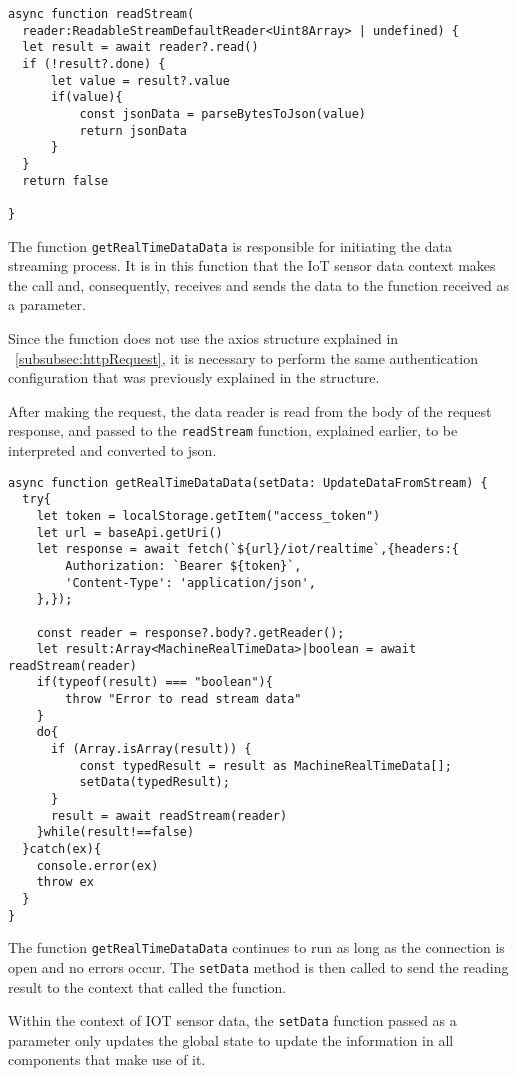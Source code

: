 \begin{verbatim}
async function readStream(
  reader:ReadableStreamDefaultReader<Uint8Array> | undefined) {
  let result = await reader?.read()
  if (!result?.done) {
      let value = result?.value
      if(value){
          const jsonData = parseBytesToJson(value)        
          return jsonData
      }
  }
  return false

}
\end{verbatim}

The function \texttt{getRealTimeDataData} is responsible for initiating the data streaming process. It is in this function that the IoT sensor data context makes the call and, consequently, receives and sends the data to the function received as a parameter.

Since the function does not use the axios structure explained in ~\ref{subsubsec:httpRequest}, it is necessary to perform the same authentication configuration that was previously explained in the structure.

After making the request, the data reader is read from the body of the request response, and passed to the \texttt{readStream} function, explained earlier, to be interpreted and converted to \gls{json}.

\begin{verbatim}
async function getRealTimeDataData(setData: UpdateDataFromStream) {
  try{
    let token = localStorage.getItem("access_token")
    let url = baseApi.getUri()
    let response = await fetch(`${url}/iot/realtime`,{headers:{
        Authorization: `Bearer ${token}`,
        'Content-Type': 'application/json',
    },});

    const reader = response?.body?.getReader();
    let result:Array<MachineRealTimeData>|boolean = await readStream(reader)
    if(typeof(result) === "boolean"){
        throw "Error to read stream data"
    }
    do{
      if (Array.isArray(result)) {
          const typedResult = result as MachineRealTimeData[];
          setData(typedResult);
      }
      result = await readStream(reader)
    }while(result!==false)
  }catch(ex){
    console.error(ex)
    throw ex
  }
}
\end{verbatim}

The function \texttt{getRealTimeDataData} continues to run as long as the connection is open and no errors occur. The \texttt{setData} method is then called to send the reading result to the context that called the function.

Within the context of IOT sensor data, the \texttt{setData} function passed as a parameter only updates the global state to update the information in all components that make use of it.

